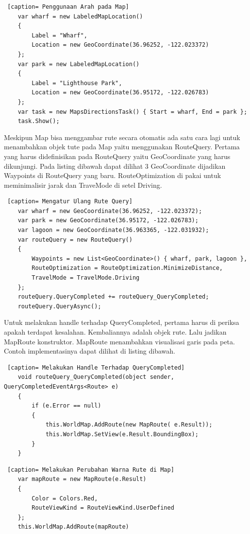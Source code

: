 \begin{lstlisting} [caption= Penggunaan Arah pada Map]
	var wharf = new LabeledMapLocation()
	{
		Label = "Wharf",
		Location = new GeoCoordinate(36.96252, -122.023372)
	};
	var park = new LabeledMapLocation()
	{
		Label = "Lighthouse Park",
		Location = new GeoCoordinate(36.95172, -122.026783)
	};
	var task = new MapsDirectionsTask() { Start = wharf, End = park };
	task.Show();
\end{lstlisting}

\hspace{0.5cm} Meskipun Map bisa menggambar rute secara otomatis ada satu cara lagi untuk menambahkan objek tute pada Map yaitu menggunakan RouteQuery. Pertama yang harus didefinisikan pada RouteQuery yaitu GeoCoordinate yang harus dikunjungi. Pada listing dibawah dapat dilihat 3 GeoCoordinate dijadikan Waypoints di RouteQuery yang baru. RouteOptimization di pakai untuk meminimalisir jarak dan TraveMode di setel Driving. 

\begin{lstlisting} [caption= Mengatur Ulang Rute Query]
	var wharf = new GeoCoordinate(36.96252, -122.023372);
	var park = new GeoCoordinate(36.95172, -122.026783);
	var lagoon = new GeoCoordinate(36.963365, -122.031932);
	var routeQuery = new RouteQuery()
	{
		Waypoints = new List<GeoCoordinate>() { wharf, park, lagoon },
		RouteOptimization = RouteOptimization.MinimizeDistance,
		TravelMode = TravelMode.Driving
	};
	routeQuery.QueryCompleted += routeQuery_QueryCompleted;
	routeQuery.QueryAsync();
\end{lstlisting}

\hspace{0.5cm} Untuk melakukan handle terhadap QueryCompleted, pertama harus di periksa apakah terdapat kesalahan. Kembaliannya adalah objek rute. Lalu jadikan MapRoute konstruktor. MapRoute menambahkan visualisasi garis pada peta. Contoh implementasinya dapat dilihat di listing dibawah.

\begin{lstlisting} [caption= Melakukan Handle Terhadap QueryCompleted]
	void routeQuery_QueryCompleted(object sender, QueryCompletedEventArgs<Route> e)
	{
		if (e.Error == null)
		{
			this.WorldMap.AddRoute(new MapRoute( e.Result));
			this.WorldMap.SetView(e.Result.BoundingBox);
		}
	}
\end{lstlisting}

\begin{lstlisting} [caption= Melakukan Perubahan Warna Rute di Map]
	var mapRoute = new MapRoute(e.Result)
	{
		Color = Colors.Red,
		RouteViewKind = RouteViewKind.UserDefined
	};
	this.WorldMap.AddRoute(mapRoute)
\end{lstlisting}

